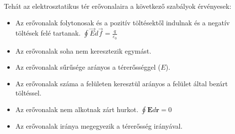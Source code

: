 \documentclass[../main.tex]{subfiles}
\begin{document}
Tehát az elektrosztatikus tér erővonalaira a következő szabályok érvényesek:
\begin{itemize}
    \item Az erővonalak folytonosak és a pozitív töltésektől indulnak és a negatív töltések felé tartanak. $\oint \vec{E} d\vec{f} = \frac{q}{\varepsilon_0}$
    \item Az erővonalak soha nem keresztezik egymást.
    \item Az erővonalak sűrűsége arányos a térerősséggel ($E$).
    \item Az erővonalak száma a felületen keresztül arányos a felület által bezárt töltéssel.
    \item Az erővonalak nem alkotnak zárt hurkot. $\oint \mathbf{E} d\mathbf{r} = 0$
    \item Az erővonalak iránya megegyezik a térerősség irányával.
\end{itemize}
\end{document}
